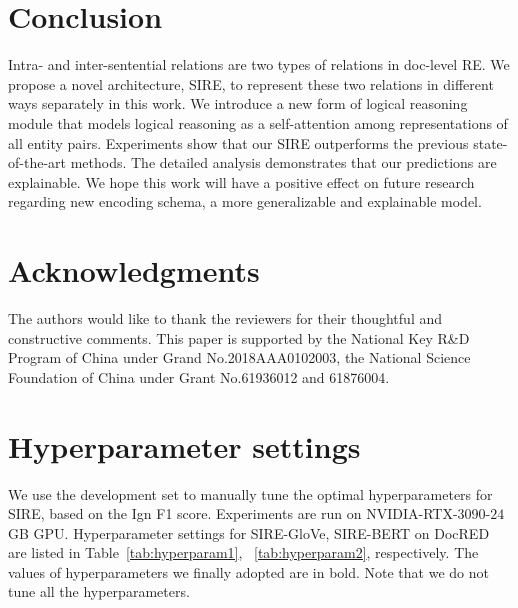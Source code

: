 \documentclass[11pt,a4paper]{article}
\begin{document}
 \section{Conclusion}
Intra- and inter-sentential relations are two types of relations in doc-level RE. We propose a novel architecture, SIRE, to represent these two relations in different ways separately in this work. We introduce a new form of logical reasoning module that models logical reasoning as a self-attention among representations of all entity pairs. Experiments show that our SIRE outperforms the previous state-of-the-art methods. The detailed analysis demonstrates that our predictions are explainable. We hope this work will have a positive effect on future research regarding new encoding schema, a more generalizable and explainable model. 


\section*{Acknowledgments}
The authors would like to thank the reviewers for their thoughtful and constructive comments.
This paper is supported by the National Key R\&D Program of China under Grand No.2018AAA0102003, the National Science Foundation of China under Grant No.61936012 and 61876004.




\appendix

\section{Hyperparameter settings\label{sec:appendix}}


We use the development set to manually tune the optimal hyperparameters for SIRE, based on the Ign F1 score.
Experiments are run on NVIDIA-RTX-3090-$24$GB GPU.
Hyperparameter settings for SIRE-GloVe, SIRE-BERT on DocRED are listed in Table~\ref{tab:hyperparam1}, ~\ref{tab:hyperparam2}, respectively. The values of hyperparameters we finally adopted are in bold. Note that we do not tune all the hyperparameters.
\end{document}
